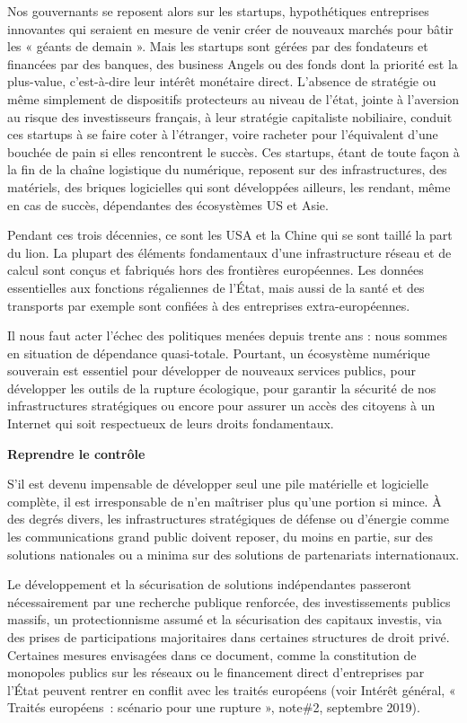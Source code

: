 \documentclass[a4paper]{article}
\begin{document}
Nos gouvernants se reposent alors sur les startups, hypothétiques entreprises innovantes qui seraient en mesure de venir créer de nouveaux marchés pour bâtir les « géants de demain ». Mais les startups sont gérées par des fondateurs et financées par des banques, des business Angels ou des fonds dont la priorité est la plus-value, c’est-à-dire leur intérêt monétaire direct. L'absence de stratégie ou même simplement de dispositifs protecteurs au niveau de l'état, jointe à l'aversion au risque des investisseurs français, à leur stratégie capitaliste nobiliaire, conduit ces startups à se faire coter à l'étranger, voire racheter pour l'équivalent d'une bouchée de pain si elles rencontrent le succès. Ces startups, étant de toute façon à la fin de la chaîne logistique du numérique, reposent sur des infrastructures, des matériels, des briques logicielles qui sont développées ailleurs, les rendant, même en cas de succès, dépendantes des écosystèmes US et Asie. 

Pendant ces trois décennies, ce sont les USA et la Chine qui se sont taillé la part du lion. La plupart des éléments fondamentaux d’une infrastructure réseau et de calcul sont conçus et fabriqués hors des frontières européennes. Les données essentielles aux fonctions régaliennes de l’État, mais aussi de la santé et des transports par exemple sont confiées à des entreprises extra-européennes. 

Il nous faut acter l’échec des politiques menées depuis trente ans : nous sommes en situation de dépendance quasi-totale. Pourtant, un écosystème numérique souverain est essentiel pour développer de nouveaux services publics, pour développer les outils de la rupture écologique, pour garantir la sécurité de nos infrastructures stratégiques ou encore pour assurer un accès des citoyens à un Internet qui soit respectueux de leurs droits fondamentaux. 

\noindent\textbf{Reprendre le contrôle}

S’il est devenu impensable de développer seul une pile matérielle et logicielle complète, il est irresponsable de n’en maîtriser plus qu’une portion si mince. À des degrés divers, les infrastructures stratégiques de défense ou d’énergie comme les communications grand public doivent reposer, du moins en partie, sur des solutions nationales ou a minima sur des solutions de partenariats internationaux. 

Le développement et la sécurisation de solutions indépendantes passeront nécessairement par une recherche publique renforcée, des investissements publics massifs, un protectionnisme assumé et la sécurisation des capitaux investis, via des prises de participations majoritaires dans certaines structures de droit privé. Certaines mesures envisagées dans ce document, comme la constitution de monopoles publics sur les réseaux ou le financement direct d’entreprises par l’État peuvent rentrer en conflit avec les traités européens (voir Intérêt général, « Traités européens~: scénario pour une rupture », note\#2, septembre 2019). 
\end{document}
